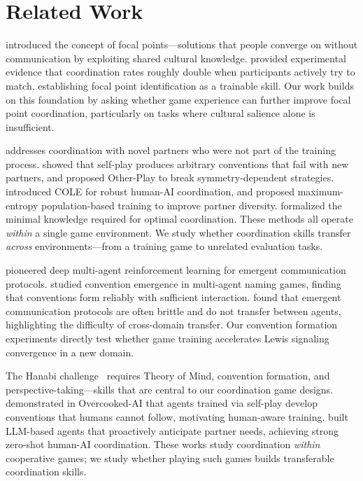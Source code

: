 \section{Related Work}
\label{sec:related}

\citet{schelling1960strategy} introduced the concept of focal points---solutions that people converge on without communication by exploiting shared cultural knowledge.
\citet{mehta1994focal} provided experimental evidence that coordination rates roughly double when participants actively try to match, establishing focal point identification as a trainable skill.
Our work builds on this foundation by asking whether game experience can further improve focal point coordination, particularly on tasks where cultural salience alone is insufficient.

\ZSC addresses coordination with novel partners who were not part of the training process.
\citet{hu2020otherplay} showed that self-play produces arbitrary conventions that fail with new partners, and proposed Other-Play to break symmetry-dependent strategies.
\citet{li2024tackling} introduced COLE for robust human-AI coordination, and \citet{zhao2021maximum} proposed maximum-entropy population-based training to improve partner diversity.
\citet{lauffer2023who} formalized the minimal knowledge required for optimal coordination.
These methods all operate \emph{within} a single game environment.
We study whether coordination skills transfer \emph{across} environments---from a training game to unrelated evaluation tasks.

\citet{foerster2016learning} pioneered deep multi-agent reinforcement learning for emergent communication protocols.
\citet{lipowska2018emergence} studied convention emergence in multi-agent naming games, finding that conventions form reliably with sufficient interaction.
\citet{bullard2020exploring} found that emergent communication protocols are often brittle and do not transfer between agents, highlighting the difficulty of cross-domain transfer.
Our convention formation experiments directly test whether game training accelerates Lewis signaling convergence in a new domain.

The Hanabi challenge~\citep{bard2020hanabi} requires Theory of Mind, convention formation, and perspective-taking---skills that are central to our coordination game designs.
\citet{carroll2019utility} demonstrated in Overcooked-AI that agents trained via self-play develop conventions that humans cannot follow, motivating human-aware training.
\citet{zhang2023proagent} built LLM-based agents that proactively anticipate partner needs, achieving strong zero-shot human-AI coordination.
These works study coordination \emph{within} cooperative games; we study whether playing such games builds transferable coordination skills.


